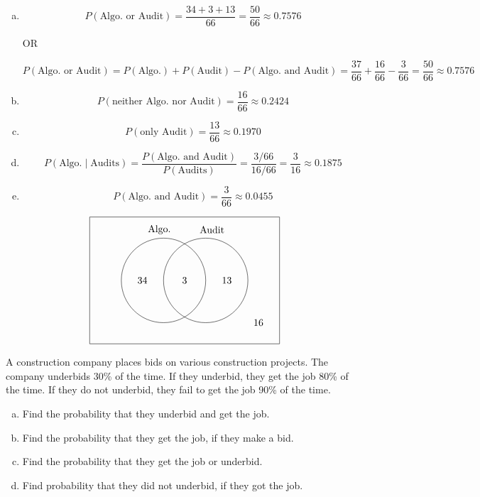 \documentclass[11pt,letterpaper]{article}
\begin{document}
\sol
\begin{enumerate}[(a)]
\item 
	\[
	P(\text{Algo. or Audit})= \dfrac{34 + 3 + 13}{66}= \dfrac{50}{66} \approx 0.7576
	\]
		\begin{center} OR \end{center}
	\[
	P(\text{Algo. or Audit})= P(\text{Algo.}) + P(\text{Audit}) - P(\text{Algo. and Audit})= \dfrac{37}{66} + \dfrac{16}{66} - \dfrac{3}{66}= \dfrac{50}{66} \approx 0.7576
	\] 

\item 
	\[
	P(\text{neither Algo. nor Audit})= \dfrac{16}{66} \approx 0.2424
	\] 

\item 
	\[
	P(\text{only Audit})= \dfrac{13}{66} \approx 0.1970
	\] 

\item 
	\[
	P(\text{Algo.} \;|\; \text{Audits})= \dfrac{P(\text{Algo. and Audit})}{P(\text{Audits})}= \dfrac{3/66}{16/66}= \dfrac{3}{16} \approx 0.1875
	\]

\item 
	\[
	P(\text{Algo. and Audit})= \dfrac{3}{66} \approx 0.0455
	\]
\end{enumerate}

	\[
	\begin{tikzpicture}[scale=0.75]
	\draw (0,0) rectangle (9,6);
	\draw (3.5,3) circle (2);
	\draw (5.5,3) circle (2);
	
	\node at (3.3,5.4) {Algo.};
	\node at (5.8,5.4) {Audit}; 
	
	\node at (2.5,3) {34};
	\node at (4.5,3) {3};
	\node at (6.5,3) {13};
	\node at (8,1) {16};
	\end{tikzpicture}
	\]





\newpage





 A construction company places bids on various construction projects. The company underbids 30\% of the time. If they underbid, they get the job 80\% of the time. If they do not underbid, they fail to get the job 90\% of the time. 
	\begin{enumerate}[(a)]
	\item Find the probability that they underbid and get the job.
	\item Find the probability that they get the job, if they make a bid. 
	\item Find the probability that they get the job or underbid. 
	\item Find probability that they did not underbid, if they got the job. 
	\end{enumerate} \pspace
\end{document}
